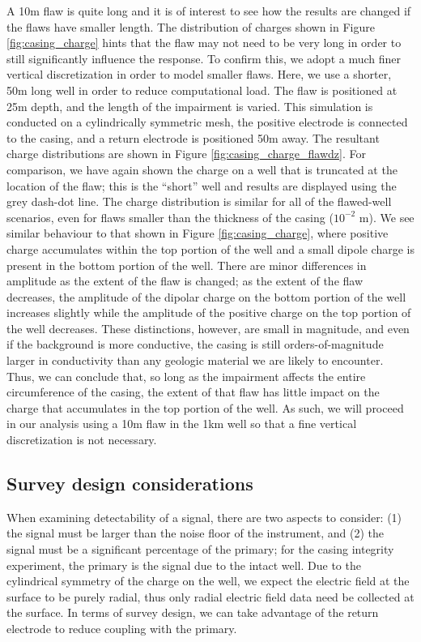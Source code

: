 A 10m flaw is quite long and it is of interest to see how the results are changed if the flaws have smaller length. The distribution of charges shown in Figure \ref{fig:casing_charge} hints that the flaw may not need to be very long in order to still significantly influence the response. To confirm this, we adopt a much finer vertical discretization in order to model smaller flaws. Here, we use a shorter, 50m long well in order to reduce computational load. The flaw is positioned at 25m depth, and the length of the impairment is varied. This simulation is conducted on a cylindrically symmetric mesh, the positive electrode is connected to the casing, and a return electrode is positioned 50m away. The resultant charge distributions are shown in Figure \ref{fig:casing_charge_flawdz}. For comparison, we have again shown the charge on a well that is truncated at the location of the flaw; this is the  ``short'' well and results are displayed using the grey dash-dot line. The charge distribution is similar for all of the flawed-well scenarios, even for flaws smaller than the thickness of the casing ($10^{-2}$ m). We see similar behaviour to that shown in Figure \ref{fig:casing_charge}, where positive charge accumulates within the top portion of the well and a small dipole charge is present in the bottom portion of the well. There are minor differences in amplitude as the extent of the flaw is changed; as the extent of the flaw decreases, the amplitude of the dipolar charge on the bottom portion of the well increases slightly while the amplitude of the positive charge on the top portion of the well decreases. These distinctions, however, are small in magnitude, and even if the background is more conductive, the casing is still orders-of-magnitude larger in conductivity than any geologic material we are likely to encounter. Thus, we can conclude that, so long as the impairment affects the entire circumference of the casing, the extent of that flaw has little impact on the charge that accumulates in the top portion of the well. As such, we will proceed in our analysis using a 10m flaw in the 1km well so that a fine vertical discretization is not necessary.




\subsection{Survey design considerations}

When examining detectability of a signal, there are two aspects to consider: (1) the signal must be larger than the noise floor of the instrument, and (2) the signal must be a significant percentage of the primary; for the casing integrity experiment, the primary is the signal due to the intact well. Due to the cylindrical symmetry of the charge on the well, we expect the electric field at the surface to be purely radial, thus only radial electric field data need be collected at the surface. In terms of survey design, we can take advantage of the return electrode to reduce coupling with the primary.

